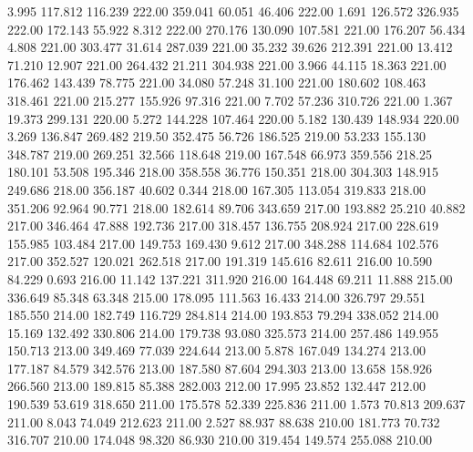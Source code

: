    3.995  117.812  116.239       222.00
 359.041   60.051   46.406       222.00
   1.691  126.572  326.935       222.00
 172.143   55.922    8.312       222.00
 270.176  130.090  107.581       221.00
 176.207   56.434    4.808       221.00
 303.477   31.614  287.039       221.00
  35.232   39.626  212.391       221.00
  13.412   71.210   12.907       221.00
 264.432   21.211  304.938       221.00
   3.966   44.115   18.363       221.00
 176.462  143.439   78.775       221.00
  34.080   57.248   31.100       221.00
 180.602  108.463  318.461       221.00
 215.277  155.926   97.316       221.00
   7.702   57.236  310.726       221.00
   1.367   19.373  299.131       220.00
   5.272  144.228  107.464       220.00
   5.182  130.439  148.934       220.00
   3.269  136.847  269.482       219.50
 352.475   56.726  186.525       219.00
  53.233  155.130  348.787       219.00
 269.251   32.566  118.648       219.00
 167.548   66.973  359.556       218.25
 180.101   53.508  195.346       218.00
 358.558   36.776  150.351       218.00
 304.303  148.915  249.686       218.00
 356.187   40.602    0.344       218.00
 167.305  113.054  319.833       218.00
 351.206   92.964   90.771       218.00
 182.614   89.706  343.659       217.00
 193.882   25.210   40.882       217.00
 346.464   47.888  192.736       217.00
 318.457  136.755  208.924       217.00
 228.619  155.985  103.484       217.00
 149.753  169.430    9.612       217.00
 348.288  114.684  102.576       217.00
 352.527  120.021  262.518       217.00
 191.319  145.616   82.611       216.00
  10.590   84.229    0.693       216.00
  11.142  137.221  311.920       216.00
 164.448   69.211   11.888       215.00
 336.649   85.348   63.348       215.00
 178.095  111.563   16.433       214.00
 326.797   29.551  185.550       214.00
 182.749  116.729  284.814       214.00
 193.853   79.294  338.052       214.00
  15.169  132.492  330.806       214.00
 179.738   93.080  325.573       214.00
 257.486  149.955  150.713       213.00
 349.469   77.039  224.644       213.00
   5.878  167.049  134.274       213.00
 177.187   84.579  342.576       213.00
 187.580   87.604  294.303       213.00
  13.658  158.926  266.560       213.00
 189.815   85.388  282.003       212.00
  17.995   23.852  132.447       212.00
 190.539   53.619  318.650       211.00
 175.578   52.339  225.836       211.00
   1.573   70.813  209.637       211.00
   8.043   74.049  212.623       211.00
   2.527   88.937   88.638       210.00
 181.773   70.732  316.707       210.00
 174.048   98.320   86.930       210.00
 319.454  149.574  255.088       210.00
